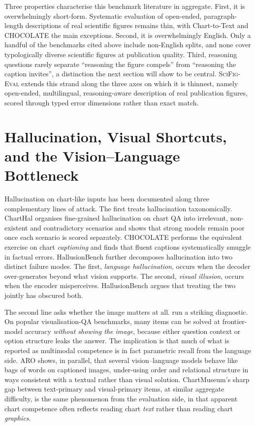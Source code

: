 Three properties characterise this benchmark literature in
aggregate. First, it is overwhelmingly short-form. Systematic
evaluation of open-ended, paragraph-length descriptions of real
scientific figures remains thin, with Chart-to-Text and CHOCOLATE
the main exceptions. Second, it is overwhelmingly English. Only a
handful of the benchmarks cited above include non-English splits,
and none cover typologically diverse scientific figures at
publication quality. Third, reasoning questions rarely separate
``reasoning the figure compels'' from ``reasoning the caption
invites'', a distinction the next section will show to be central.
\textsc{SciFig-Eval} extends this strand along the three axes on
which it is thinnest, namely open-ended, multilingual,
reasoning-aware description of real publication figures, scored
through typed error dimensions rather than exact match.

\section{Hallucination, Visual Shortcuts, and the Vision--Language Bottleneck}
\label{sec:lit-halluc}

Hallucination on chart-like inputs has been documented along three
complementary lines of attack. The first treats hallucination
taxonomically. ChartHal \citep{xu2025charthal} organises fine-grained
hallucination on chart QA into irrelevant, non-existent and
contradictory scenarios and shows that strong models remain poor
once each scenario is scored separately. CHOCOLATE
\citep{huang2024chocolate} performs the equivalent exercise on chart
\emph{captioning} and finds that fluent captions systematically
smuggle in factual errors. HallusionBench
\citep{guan2024hallusionbench} further decomposes hallucination into
two distinct failure modes. The first, \emph{language hallucination},
occurs when the decoder over-generates beyond what vision supports.
The second, \emph{visual illusion}, occurs when the encoder
misperceives. HallusionBench argues that treating the two jointly
has obscured both.

The second line asks whether the image matters at all.
\citet{li2025seeorrecall} run a striking diagnostic. On popular
visualisation-QA benchmarks, many items can be solved at
frontier-model accuracy \emph{without showing the image}, because
either question context or option structure leaks the answer. The
implication is that much of what is reported as multimodal
competence is in fact parametric recall from the language side. ARO
\citep{yuksekgonul2022aro} shows, in parallel, that several
vision--language models behave like bags of words on captioned
images, under-using order and relational structure in ways consistent
with a textual rather than visual solution. ChartMuseum's
\citep{tang2025chartmuseum} sharp gap between text-primary and
visual-primary items, at similar aggregate difficulty, is the same
phenomenon from the evaluation side, in that apparent chart
competence often reflects reading chart \emph{text} rather than
reading chart \emph{graphics}.


